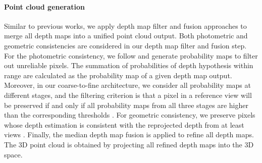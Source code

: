 \documentclass{bmvc2k}
\begin{document}
\vspace{-5mm}\paragraph{Point cloud generation}
Similar to previous works, we apply depth map filter and fusion approaches to merge all depth maps into a unified point cloud output. Both photometric and geometric consistencies are considered in our depth map filter and fusion step. For the photometric consistency, we follow \cite{yao2018mvsnet} and generate probability maps to filter out unreliable pixels. The summation of probabilities of depth hypothesis within range  are calculated as the probability map of a given depth map output. Moreover, in our coarse-to-fine architecture, we consider all probability maps at different stages, and the filtering criterion is that a pixel in a reference view will be preserved if and only if all probability maps from all three stages are higher than the corresponding thresholds . For geometric consistency, we preserve pixels whose depth estimation is consistent with the reprojected depth from at least  views \cite{yao2018mvsnet}. Finally, the median depth map fusion is applied to refine all depth maps. The 3D point cloud is obtained by projecting all refined depth maps into the 3D space. 
\end{document}
